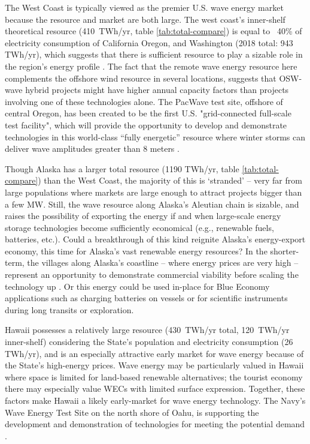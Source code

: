 The West Coast is typically viewed as the premier U.S. wave energy market because the resource and market are both large. The west coast's inner-shelf theoretical resource (410~TWh/yr, table \ref{tab:total-compare}) is equal to ~40\% of electricity consumption of California Oregon, and Washington (2018 total: 943 TWh/yr), which suggests that there is sufficient resource to play a sizable role in the region's energy profile \citep{energyinformationadministrationStateEnergyConsumption2020}.  
The fact that the remote wave energy resource here complements the offshore wind resource in several locations, suggests that OSW-wave hybrid projects might have higher annual capacity factors than projects involving one of these technologies alone. The PacWave test site, offshore of central Oregon, has been created to be the first U.S. "grid-connected full-scale test facility", which will provide the opportunity to develop and demonstrate technologies in this world-class ``fully energetic'' resource where winter storms can deliver wave amplitudes greater than 8 meters \citep[e.g.][]{allan_climate_2006}.

Though Alaska has a larger total resource (1190 TWh/yr, table \ref{tab:total-compare}) than the West Coast, the majority of this is `stranded' -- very far from large populations where markets are large enough to attract projects bigger than a few MW. Still, the wave resource along Alaska's Aleutian chain is sizable, and raises the possibility of exporting the energy if and when large-scale energy storage technologies become sufficiently economical (e.g., renewable fuels, batteries, etc.). Could a breakthrough of this kind reignite Alaska's energy-export economy, this time for Alaska's vast renewable energy resources? In the shorter-term, the villages along Alaska's coastline -- where energy prices are very high -- represent an opportunity to demonstrate commercial viability before scaling the technology up \cite{alaskaenergyauthority2019PowerCost2020}. Or this energy could be used in-place for Blue Economy applications such as charging batteries on vessels or for scientific instruments during long transits or exploration. 

Hawaii possesses a relatively large resource (430~TWh/yr total, 120~TWh/yr inner-shelf) considering the State's population and electricity consumption (26 TWh/yr), and is an especially attractive early market for wave energy because of the State's high-energy prices. 
Wave energy may be particularly valued in Hawaii where space is limited for land-based renewable alternatives; the tourist economy there may especially value WECs with limited surface expression. Together, these factors make Hawaii a likely early-market for wave energy technology. The Navy's Wave Energy Test Site on the north shore of Oahu, is supporting the development and demonstration of technologies for meeting the potential demand \citep{crossEarlyResearchEfforts2015}.

